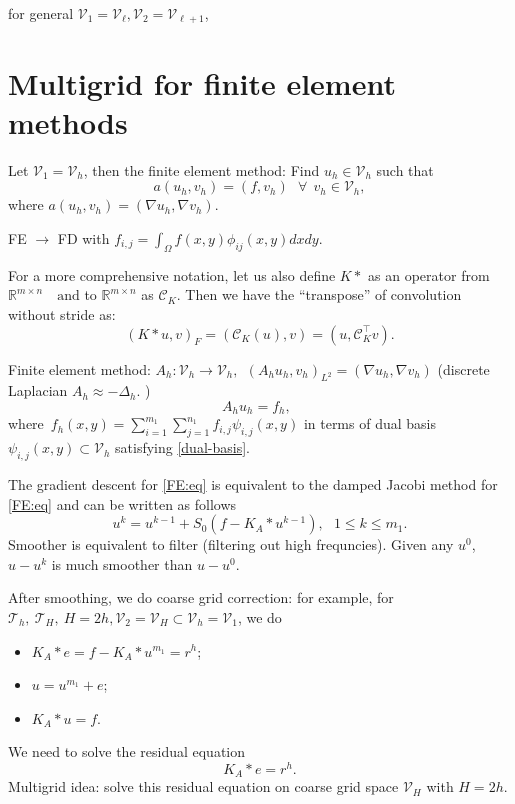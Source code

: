 for general $\mathcal V_1=\mathcal  V_\ell,  \mathcal V_2=\mathcal  V_{\ell+1}$, 
 
 
 \section{Multigrid for finite element methods}
Let $\mathcal  V_1=\mathcal  V_h$, then the finite element method: Find $u_h\in \mathcal  V_h$ such that 
\begin{equation}\label{FEdis}
a(u_h, v_h)=(f, v_h)~~~\forall~~v_h\in \mathcal  V_h,
\end{equation}
where $a(u_h, v_h)=(\nabla u_h, \nabla v_h)$.
\begin{lemma}
FE $\rightarrow$ FD with $f_{i,j}=\int_{\Omega}f(x,y)\phi_{ij}(x,y)dxdy$.
\end{lemma}

For a more comprehensive notation, let us also define 
$K\ast$ as an operator from $\mathbb{R}^{m\times n} \quad \text{and}$
to $\mathbb{R}^{m\times n}$ as $\mathcal C_K$.
Then we have the ``transpose'' of convolution without stride as:
\begin{equation}\label{eq:def_tran_conv}
(K \ast u, v)_F = (\mathcal C_K (u), v) =  (u,  \mathcal C_K^\top v).
\end{equation}

Finite element method: $A_h: \mathcal  V_h\rightarrow \mathcal  V_h, ~~(A_hu_h,v_h)_{L^2}=(\nabla u_h, \nabla v_h)$ (discrete Laplacian $A_h\approx -\Delta_h$. )
\begin{equation}\label{FE:eq}
A_hu_h=f_h,~~ 
\end{equation}
where~$f_h(x,y)=\sum_{i=1}^{m_1}\sum_{j=1}^{n_1}f_{i,j}\psi_{i,j}(x,y)$ in terms of dual basis $\psi_{i,j}(x,y)\subset \mathcal V_h$ satisfying \eqref{dual-basis}.

The gradient descent for \eqref{FE:eq} is equivalent to the damped Jacobi method for \eqref{FE:eq} and can be written as follows
$$
u^k=u^{k-1}+S_0(f-K_A\ast u^{k-1}),~~~1\le k\le m_1.
$$
Smoother is equivalent to filter (filtering out high frequncies). Given any $u^0$, $u-u^k$ is much smoother than $u-u^0$.


After smoothing, we do coarse grid correction: for example, for 
$\mathcal T_h,~\mathcal T_H,~H=2h, \mathcal V_2=\mathcal V_H\subset \mathcal V_h=\mathcal V_1$, we do
\begin{itemize}
\item $K_A\ast e=f- K_A\ast u^{m_1}=r^h$;
\item  $u=u^{m_1}+e$;
\item  $K_A\ast u=f$.
\end{itemize}
We need to solve the residual equation
$$
K_A\ast e=r^h.
$$
Multigrid idea: solve this residual  equation on coarse grid space $\mathcal V_H$ with $H=2h$.



